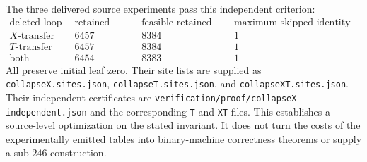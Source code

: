 The three delivered source experiments pass this independent criterion:
\[
\begin{array}{l|r|r|r}
\text{deleted loop}&\text{retained leaves}&
\text{feasible retained cases}&\text{maximum skipped identity steps}\\\hline
X\text{-transfer}&6457&8384&1\\
T\text{-transfer}&6457&8384&1\\
\text{both transfers}&6454&8383&1
\end{array}
\]
All preserve initial leaf zero.  Their site lists are supplied as
\texttt{collapseX.sites.json}, \texttt{collapseT.sites.json}, and
\texttt{collapseXT.sites.json}.  Their independent certificates are
\texttt{verification/proof/collapseX-independent.json} and the
corresponding \texttt{T} and \texttt{XT} files.  This establishes a
source-level optimization on the stated invariant.  It does not turn
the costs of the experimentally emitted tables into binary-machine
correctness theorems or supply a sub-$246$ construction.
